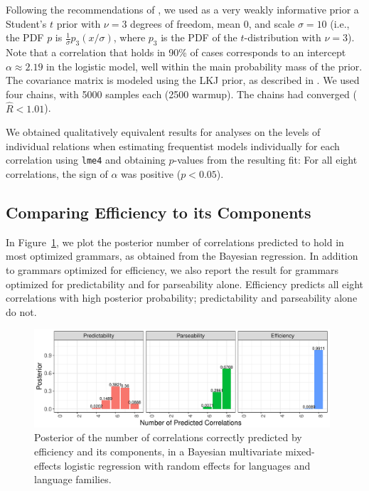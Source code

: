 \documentclass[10pt,twoside,lineno]{article}
\begin{document}

Following the recommendations of \cite{ghosh2018use, burkner2018advanced}, we used as a very weakly informative prior a Student's $t$ prior with $\nu=3$ degrees of freedom, mean 0, and scale $\sigma=10$ (i.e., the PDF $p$ is $\frac{1}{\sigma} p_3(x/\sigma)$, where $p_3$ is the PDF of the $t$-distribution with $\nu=3$).
Note that a correlation that holds in 90\% of cases corresponds to an intercept $\alpha \approx 2.19$ in the logistic model, well within the main probability mass of the prior.
The covariance matrix is modeled using the LKJ prior, as described in \cite{burkner2018advanced}.
We used four chains, with 5000 samples each (2500 warmup).
The chains had converged ($\hat{R} < 1.01$).

We obtained qualitatively equivalent results for analyses on the levels of individual relations when estimating frequentist models individually for each correlation using \texttt{lme4} \cite{bates2015fitting} and obtaining $p$-values from the resulting fit: For all eight correlations, the sign of $\alpha$ was positive ($p < 0.05$).




\subsection{Comparing Efficiency to its Components}\label{sec:posterior-number}


In Figure~\ref{fig:posterior}, we plot the posterior number of correlations predicted to hold in most optimized grammars, as obtained from the Bayesian regression.
In addition to grammars optimized for efficiency, we also report the result for grammars optimized for predictability and for parseability alone.
Efficiency predicts all eight correlations with high posterior probability; predictability and parseability alone do not.

\begin{figure}[ht]
	\begin{center}
	\includegraphics[width=0.98\textwidth]{../results/correlations/figures/posterior-satisfied-universals-together-large-three.pdf}
	\end{center}
	\caption{Posterior of the number of correlations correctly predicted by efficiency and its components, in a Bayesian multivariate mixed-effects logistic regression with random effects for languages and language families.}\label{fig:posterior}
\end{figure}
\end{document}
